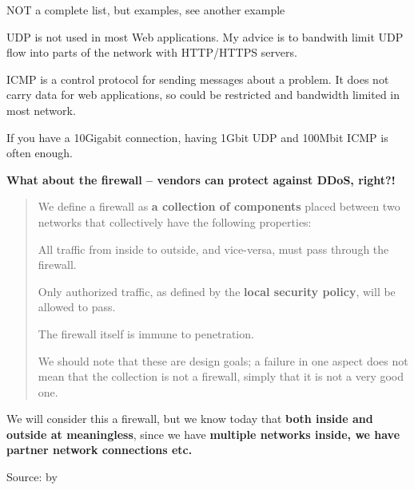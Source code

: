 \documentclass[Screen16to9,17pt]{foils}
\begin{document}


NOT a complete list, but examples, see another example\\


UDP is not used in most Web applications. My advice is to bandwith limit UDP flow into parts of the network with HTTP/HTTPS servers.


ICMP is a control protocol for sending messages about a problem. It does not carry data for web applications, so could be restricted and bandwidth limited in most network.

If you have a 10Gigabit connection, having 1Gbit UDP and 100Mbit ICMP is often enough.

{\bf What about the firewall -- vendors can protect against DDoS, right?!}



\begin{quote}
We define a firewall as {\bf a collection of components} placed between two networks that collectively have
the following properties:
\begin{list2}
\item All traffic from inside to outside, and vice-versa, must pass through the firewall.
\item Only authorized traffic, as defined by the {\bf local security policy}, will be allowed to pass.
\item The firewall itself is immune to penetration.
\end{list2}
We should note that these are design goals; a failure in one aspect does not mean that the collection
is not a firewall, simply that it is not a very good one.
\end{quote}

We will consider this a firewall, but we know today that {\bf both inside and outside at meaningless}, since we have {\bf multiple networks inside, we have partner network connections etc.}

Source:  by \citeauthor{Cheswick94} \citeyear{Cheswick94}
\end{document}
